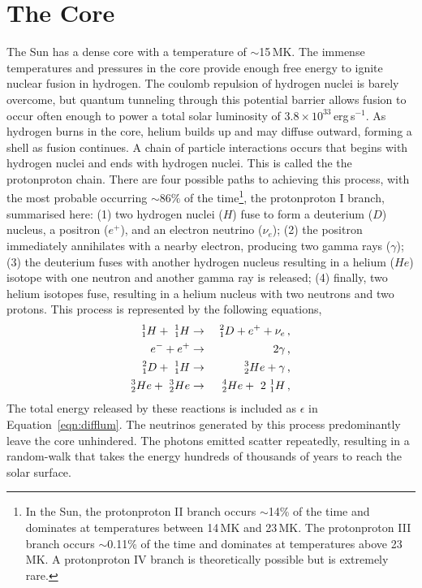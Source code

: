 \section{The Core}\label{sect:thecore}

The Sun has a dense core with a temperature of $\sim$15\,MK. The immense temperatures and pressures in the core provide enough free energy to ignite nuclear fusion in hydrogen. The coulomb repulsion of hydrogen nuclei is barely overcome, but quantum tunneling through this potential barrier allows fusion to occur often enough to power a total solar luminosity of $3.8\times10^{33}$\,erg\,s$^{-1}$. As hydrogen burns in the core, helium builds up and may diffuse outward, forming a shell as fusion continues. A chain of particle interactions occurs that begins with hydrogen nuclei and ends with hydrogen nuclei. This is called the the \gls{protonproton} chain. There are four possible paths to achieving this process, with the most probable occurring $\sim86\%$ of the time\footnote{In the Sun, the \gls{protonproton} II branch occurs $\sim$14\% of the time and dominates at temperatures between 14\,MK and 23\,MK. The \gls{protonproton} III branch occurs $\sim$0.11\% of the time and dominates at temperatures above 23\,MK. A \gls{protonproton} IV branch is theoretically possible but is extremely rare.}, the \gls{protonproton} I branch, summarised here: 
(1) two hydrogen nuclei ($H$) fuse to form a deuterium ($D$) nucleus, a positron ($e^+$), and an electron neutrino ($\nu_e$);
(2) the positron immediately annihilates with a nearby electron, producing two gamma rays ($\gamma$);
(3) the deuterium fuses with another hydrogen nucleus resulting in a helium ($He$) isotope with one neutron and another gamma ray is released;
(4) finally, two helium isotopes fuse, resulting in a helium nucleus with two neutrons and two protons.
This process is represented by the following equations,
\begin{eqnarray}
^{1}_{1}H +~^{1}_{1}H &\rightarrow&~^{2}_{1}D + e^+ + \nu_e \mbox{\,,} \\
e^- + e^+ &\rightarrow& 2\gamma \mbox{\,,} \\
^{2}_{1}D +~^{1}_{1}H &\rightarrow&~^{3}_{2}He + \gamma \mbox{\,,} \\
^{3}_{2}He +~^{3}_{2}He &\rightarrow&~^{4}_{2}He +~2~^{1}_{1}H \mbox{\,,}
\end{eqnarray}
The total energy released by these reactions is included as $\epsilon$ in Equation~\ref{eqn:difflum}. The neutrinos generated by this process predominantly leave the core unhindered. The photons emitted scatter repeatedly, resulting in a random-walk that takes the energy hundreds of thousands of years to reach the solar surface.%

